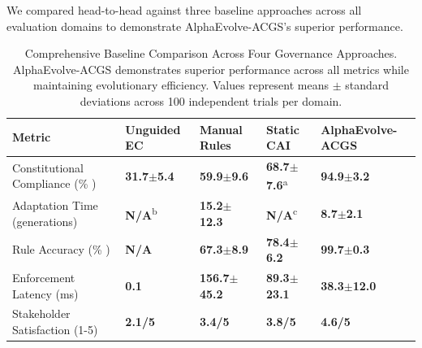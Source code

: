 \documentclass[manuscript,screen,review,anonymous,9pt]{acmart}
\newcommand{\tablesize}{\tiny}
\newcommand{\tablenumfmt}[1]{\textbf{#1}}
\newcommand{\tableheader}[1]{\textbf{#1}}
\begin{document}
We compared head-to-head against three baseline approaches across all evaluation domains to demonstrate AlphaEvolve-ACGS's superior performance.

\begin{table}[htbp]
	\centering
	\caption{Comprehensive Baseline Comparison Across Four Governance Approaches. AlphaEvolve-ACGS demonstrates superior performance across all metrics while maintaining evolutionary efficiency. Values represent means $ \pm $ standard deviations across 100 independent trials per domain.}
	\label{tab:baseline_comparison}
	\tablesize
	\begin{tabular}{@{}l>{\centering\arraybackslash}p{1.1cm}>{\centering\arraybackslash}p{1.1cm}>{\centering\arraybackslash}p{1.1cm}>{\centering\arraybackslash}p{1.2cm}@{}}
		\toprule
		\tableheader{Metric}           & \tableheader{Unguided EC} & \tableheader{Manual Rules} & \tableheader{Static CAI}    & \tableheader{AlphaEvolve-ACGS}   \\
		\midrule
		Constitutional Compliance (\% ) & \tablenumfmt{31.7$\pm$5.4}                  & \tablenumfmt{59.9$\pm$9.6}                   & \tablenumfmt{68.7$\pm$7.6}\textsuperscript{a} & \textbf{\tablenumfmt{94.9$\pm$3.2}}  \\
		Adaptation Time (generations)  & \tablenumfmt{N/A}\textsuperscript{b}    & \tablenumfmt{15.2$\pm$12.3}                  & \tablenumfmt{N/A}\textsuperscript{c}      & \textbf{\tablenumfmt{8.7$\pm$2.1}}   \\
		Rule Accuracy (\% )             & \tablenumfmt{N/A}                       & \tablenumfmt{67.3$\pm$8.9}                   & \tablenumfmt{78.4$\pm$6.2}                    & \textbf{\tablenumfmt{99.7$\pm$0.3}}  \\
		Enforcement Latency (ms)       & \tablenumfmt{0.1}                       & \tablenumfmt{156.7$\pm$45.2}                 & \tablenumfmt{89.3$\pm$23.1}                   & \textbf{\tablenumfmt{38.3$\pm$12.0}} \\
		Stakeholder Satisfaction (1-5) & \tablenumfmt{2.1/5}                     & \tablenumfmt{3.4/5}                      & \tablenumfmt{3.8/5}                       & \textbf{\tablenumfmt{4.6/5}}     \\
		\bottomrule
	\end{tabular}

\end{table}
\end{document}
